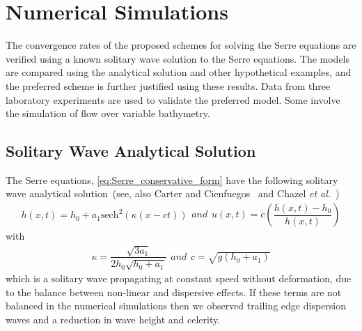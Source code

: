 \documentclass[preprint,sort&compress,1p]{article}
\begin{document}
\section{Numerical Simulations}\label{section:Numerical Simulations}

The convergence rates of the proposed schemes for solving the Serre equations are verified using a known solitary wave solution to the Serre equations. The models are compared using the analytical solution and other hypothetical examples, and the preferred scheme is further justified using these results. Data from three laboratory experiments are used to validate the preferred model. Some involve the simulation of flow over variable bathymetry.

\subsection{Solitary Wave Analytical Solution}\label{Analytical Solution}

The Serre equations, \eqref{eq:Serre_conservative_form} have the following solitary wave analytical  solution~\cite{El-etal-2006}(see, also Carter and Cienfuegos~\cite{Carter-Cienfuegos-2010-259}
and Chazel \emph{et al.}~\cite{Chazel-etal-2011-105})
\begin{subequations}\label{eq:Carter-Cienfuegos-solitary-wave}
\label{eq:Carter-9}
\begin{gather}
h(x,t) = h_0 + a_1 \text{sech}^2(\kappa(x - ct))
\label{eq:Carter-Cienfuegos-solitary-wave_h}
\end{gather}
and
\begin{gather}
u(x,t) = c \left ( \dfrac{h(x,t) - h_0}{h(x,t)} \right )
\end{gather}
\end{subequations}
with
\begin{subequations}
\begin{gather}
\kappa = \dfrac{\sqrt{3a_1}}{2h_0\sqrt{h_0 + a_1}}
\end{gather}
and
\begin{gather}
c = \sqrt{g(h_0 + a_1)}
\end{gather}
\end{subequations}
which is a solitary wave propagating at constant speed without deformation, due to the balance between non-linear and dispersive effects.   If these terms are not balanced  in the numerical simulations then we observed trailing edge dispersion waves and a reduction in wave height and celerity.
\end{document}
